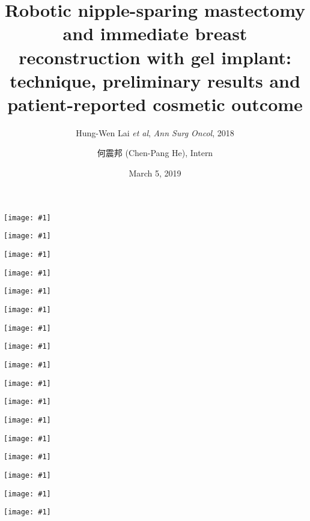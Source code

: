 \documentclass{beamer}
\title[(Lai \textit{et al}, 2018)]{
    Robotic nipple-sparing mastectomy and immediate breast reconstruction with
    gel implant: technique, preliminary results and patient-reported cosmetic
    outcome
}
\subtitle{Hung-Wen Lai \textit{et al}, \textit{Ann Surg Oncol}, 2018}
\author[Chen-Pang He]{何震邦 (Chen-Pang He), Intern}
\date{March 5, 2019}
\institute[CGH]{Cathay General Hospital}
\newcommand*{\solo}[1]{\centering\texttt{[image: \#1]}}
\begin{document}
\maketitle

\begin{frame}
    \solo{F1a.png}
\end{frame}

\begin{frame}
    \solo{F1d.png}
\end{frame}

\begin{frame}
    \solo{F1f.png}
\end{frame}

\begin{frame}
    \solo{F1h.png}
\end{frame}

\begin{frame}
    \solo{F2a.jpg}
\end{frame}

\begin{frame}
    \solo{F2d.jpg}
\end{frame}

\begin{frame}
    \solo{F3a.jpg}
\end{frame}

\begin{frame}
    \solo{F3g.eps}
\end{frame}

\begin{frame}
    \solo{T1a.eps}
\end{frame}

\begin{frame}
    \solo{T1b.eps}
\end{frame}

\begin{frame}
    \solo{T1c.eps}
\end{frame}

\begin{frame}
    \solo{T1d.eps}
\end{frame}

\begin{frame}
    \solo{T1e.eps}
\end{frame}

\begin{frame}
    \solo{T1f.eps}
\end{frame}

\begin{frame}
    \solo{T2a.eps}
\end{frame}

\begin{frame}
    \solo{T2b.eps}
\end{frame}

\begin{frame}
    \solo{T3.eps}
\end{frame}
\end{document}
